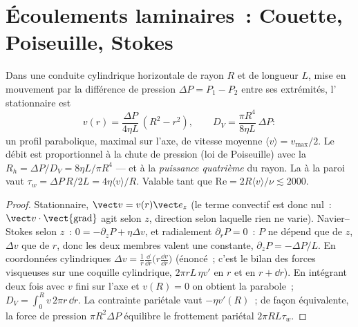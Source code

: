 \section{Écoulements laminaires~: Couette, Poiseuille, Stokes}

\begin{proposition}\label{prop:b2:viscous-flows:poiseuille}
Dans une conduite cylindrique horizontale de rayon $R$ et de longueur $L$, mise en mouvement par
la différence de pression $\Delta P = P_1 - P_2$ entre ses extrémités, l' stationnaire est
\[
v(r) = \frac{\Delta P}{4\eta L}\,(R^2 - r^2) , \qquad
D_V = \frac{\pi R^4}{8\eta L}\,\Delta P :
\]
un profil parabolique, maximal sur l'axe, de vitesse moyenne
$\langle v\rangle = v_{\max}/2$. Le débit est proportionnel à la
chute de pression (loi de Poiseuille) avec la \emph{}
$R_h = \Delta P/D_V = 8\eta L/\pi R^4$ --- et à la \emph{puissance quatrième} du
rayon. La  à la paroi vaut $\tau_w = \Delta P\,R/2L = 4\eta\langle v
\rangle/R$. Valable tant que $\mathrm{Re} = 2R\langle v\rangle/\nu \lesssim 2000$.
\end{proposition}

\begin{proof}
Stationnaire, $\vect v = v(r)\vect e_z$ (le terme convectif est donc nul~: $\vect v
\cdot\operatorname{\vect{grad}}$ agit selon $z$, direction selon laquelle rien ne
varie). Navier--Stokes selon $z$~: $0 = -\partial_zP + \eta\Delta v$, et
radialement $\partial_rP = 0$~: $P$ ne dépend que de $z$, $\Delta v$ que de $r$, donc
les deux membres valent une constante, $\partial_zP = -\Delta P/L$. En coordonnées
cylindriques $\Delta v = \frac1r\frac{\dd}{\dd r}\bigl(r\frac{\dd v}{\dd r}\bigr)$
(énoncé~; c'est le bilan des forces visqueuses sur une coquille cylindrique,
$2\pi rL\,\eta v'$ en $r$ et en $r + \dd r$). En intégrant deux fois avec $v$
fini sur l'axe et $v(R) = 0$ on obtient la parabole~; $D_V = \int_0^Rv\,2\pi
r\,\dd r$. La contrainte pariétale vaut $-\eta v'(R)$~; de façon équivalente, la force
de pression $\pi R^2\Delta P$ équilibre le frottement pariétal $2\pi RL\tau_w$.
\end{proof}

